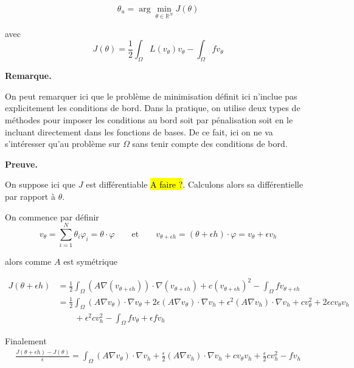 \documentclass[french]{article}
\newenvironment{preuve}[1][]{\begin{tcolorbox}[
	colback=white, %
	colframe=green!70!black, %
	arc=2mm, %
	boxrule=1pt, %
	breakable, enhanced jigsaw
	]
	\textcolor{green!70!black}{\textbf{Preuve.} \\}

	#1
}{\end{tcolorbox}}
\newenvironment{remarque}[1][]{\begin{tcolorbox}[
	colback=white, %
	arc=2mm, %
	borderline={0.5mm}{0mm}{black!15!white},
	borderline={0.5mm}{0mm}{black!50!white,dashed},
	breakable, enhanced jigsaw
	]
	\textcolor{black!70!black}{\textbf{Remarque.}} #1
}{\end{tcolorbox}}
\begin{document}
\begin{itemize}[label=]
		\begin{equation}
			\theta_u = \arg\min_{\theta \in \mathbb{R}^N}J(\theta) \label{min_galerkin_discret}
		\end{equation}
		
		avec
		\begin{equation*}
			J(\theta)=\frac{1}{2}\int_\Omega L(v_\theta)v_\theta - \int_\Omega fv_\theta
		\end{equation*}
	
		\begin{remarque}
			On peut remarquer ici que le problème de minimisation définit ici n'inclue pas explicitement les conditions de bord. Dans la pratique, on utilise deux types de méthodes pour imposer les conditions au bord soit par pénalisation soit en le incluant directement dans les fonctions de bases. De ce fait, ici on ne va s'intéresser qu'au problème sur $\Omega$ sans tenir compte des conditions de bord.
		\end{remarque}
	
		\begin{preuve}			
			On suppose ici que $J$ est différentiable \hl{A faire ?}. Calculons alors sa différentielle par rapport à $\theta$.
			
			On commence par définir 
			\begin{equation*}
				v_\theta=\sum_{i=1}^{N} \theta_i \varphi_i=\theta\cdot\varphi \qquad \text{et} \qquad v_{\theta+\epsilon h}=(\theta+\epsilon h)\cdot\varphi=v_\theta+\epsilon v_h
			\end{equation*}
		
			alors comme $A$ est symétrique

			\begin{align*}
				J(\theta+\epsilon h)&=\frac{1}{2} \int_{\Omega} (A\nabla(v_{\theta+\epsilon h})) \cdot \nabla(v_{\theta+\epsilon h}) + c(v_{\theta+\epsilon h})^2 - \int_{\Omega} fv_{\theta+\epsilon h} \\
				&=\frac{1}{2} \int_{\Omega} (A\nabla v_\theta) \cdot \nabla v_\theta + 2\epsilon (A\nabla v_\theta) \cdot \nabla v_h + \epsilon^2 (A\nabla v_h) \cdot \nabla v_h + cv_\theta^2+2\epsilon cv_\theta v_h \\
				& \qquad +\epsilon^2cv_h^2 - \int_{\Omega} fv_\theta+\epsilon fv_h
			\end{align*}
			
			Finalement
			\begin{align*}
				\frac{J(\theta+\epsilon h)-J(\theta)}{\epsilon} = \int_{\Omega} (A\nabla v_\theta) \cdot \nabla v_h + \frac{\epsilon}{2} (A\nabla v_ h) \cdot \nabla v_h + cv_\theta v_h+ \frac{\epsilon}{2}cv_h^2 - fv_h
			\end{align*}
			

\end{preuve}
\end{itemize}
\end{document}
